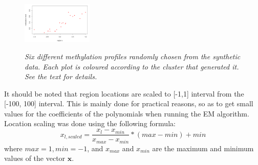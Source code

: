 \begin{figure}[ht!]
\begin{center}
{            \label{fig:fifth1}
            \includegraphics[width=0.3\textwidth]{images/prof5}
        }
    \end{center}
    \caption{\emph{Six different methylation profiles randomly chosen from the synthetic data. Each plot is coloured according to the cluster that generated it. See the text for details.}}
   \label{meth-prof-pic}
\end{figure}

It should be noted that region locations are scaled to [-1,1] interval from the [-100, 100] interval. This is mainly done for practical reasons, so as to get small values for the coefficients of the polynomials when running the EM algorithm. Location scaling was done using the following formula:
\begin{equation}
	x_{l,scaled} = \frac{x_{l} - x_{min}}{x_{max} - x_{min}} * (max - min) + min
\end{equation}
where $max=1, min=-1$, and $x_{max}$ and $x_{min}$ are the maximum and minimum values of the vector $\mathbf{x}$.